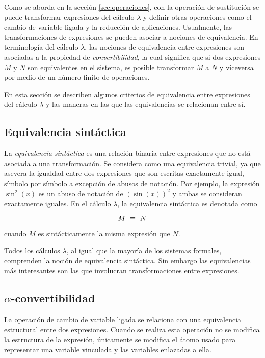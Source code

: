 Como se aborda en la sección \ref{sec:operaciones}, con la operación de sustitución se puede transformar expresiones del cálculo \( λ \) y definir otras operaciones como el cambio de variable ligada y la reducción de aplicaciones. Usualmente, las transformaciones de expresiones se pueden asociar a nociones de equivalencia. En terminología del cálculo \( λ \), las nociones de equivalencia entre expresiones son asociadas a la propiedad de \emph{convertibilidad}, la cual significa que si dos expresiones \( M \) y \( N \) son equivalentes en el sistema, es posible transformar \( M \) a \( N \) y viceversa por medio de un número finito de operaciones.

En esta sección se describen algunos criterios de equivalencia entre expresiones del cálculo \( λ \) y las maneras en las que las equivalencias se relacionan entre sí.

\subsection{Equivalencia sintáctica}
\label{sec:equivalencia-sintactica}

La \emph{equivalencia sintáctica} es una relación binaria entre expresiones que no está asociada a una transformación. Se considera como una equivalencia trivial, ya que asevera la igualdad entre dos expresiones que son escritas exactamente igual, símbolo por símbolo a excepción de abusos de notación. Por ejemplo, la expresión \( \sin^{2}(x) \) es un abuso de notación de \( \left( \sin(x) \right)^{2} \) y ambas se consideran exactamente iguales. En el cálculo \( λ \), la equivalencia sintáctica es denotada como

\[ M \ \equiv\  N \]

cuando \( M \) es sintácticamente la misma expresión que \( N \).

Todos los cálculos \( λ \), al igual que la mayoría de los sistemas formales, comprenden la noción de equivalencia sintáctica. Sin embargo las equivalencias más interesantes son las que involucran transformaciones entre expresiones.

\subsection{\texorpdfstring{\( α \)-convertibilidad}{alfa-convertibilidad}}
\label{sec:alfa-convertibilidad}

La operación de cambio de variable ligada se relaciona con una equivalencia estructural entre dos expresiones. Cuando se realiza esta operación no se modifica la estructura de la expresión, únicamente se modifica el átomo usado para representar una variable vinculada y las variables enlazadas a ella.

